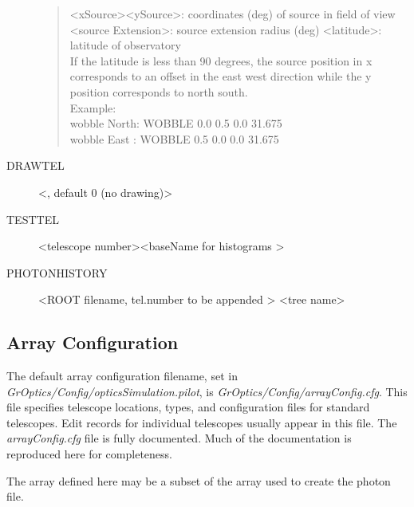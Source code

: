 \documentclass{article}
\begin{document}
\begin{description}
\begin{quote}
   \textless xSource\textgreater \textless ySource\textgreater : coordinates (deg) of source in 
   field of view
   \textless source Extension\textgreater : source extension radius (deg)
   \textless latitude\textgreater : latitude of observatory \\
   If the
   latitude is less than 90 degrees, the source position in x corresponds to an
   offset in the east west direction while the y position corresponds to north 
   south. \\
   Example: \\
   wobble North: WOBBLE 0.0 0.5 0.0 31.675 \\  
   wobble East : WOBBLE 0.5 0.0 0.0 31.675 \\
   
\end{quote}

\item[DRAWTEL]  \textless <telescope number to draw>, default 0 (no drawing)\textgreater  \\
\item[TESTTEL]  \textless telescope number\textgreater  \textless baseName for histograms \textgreater \\
\item[PHOTONHISTORY] \textless ROOT filename, tel.number to be appended \textgreater 
  \textless tree name\textgreater \\
\end{description}

\subsection{Array Configuration}\label{SS:ARRAY}
The default array configuration filename, set in  \emph{GrOptics/Config/opticsSimulation.pilot},
is \emph{GrOptics/Config/arrayConfig.cfg}. This file specifies telescope locations, types,
and configuration files for standard telescopes. Edit records for individual telescopes
usually appear in this file.  
The \emph{arrayConfig.cfg} file is fully documented. Much of the documentation
is reproduced here for completeness.

The array defined here may be a subset of the array used to create the photon file.

\end{document}
